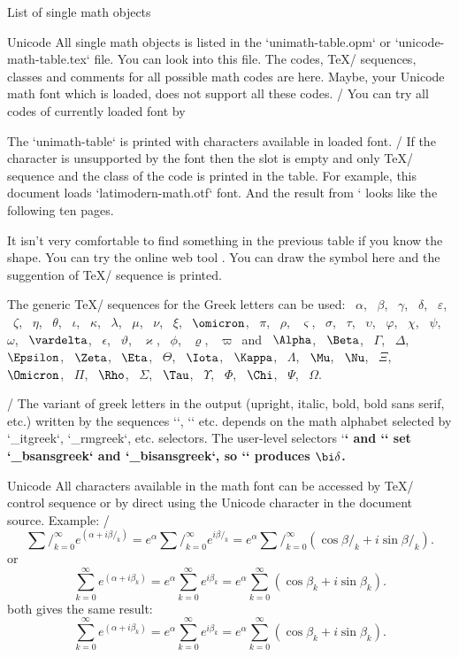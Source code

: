 \secc[objects] List of single math objects

\new Unicode
All single math objects is listed in the `unimath-table.opm` or
`unicode-math-table.tex` file. You can
look into this file. The codes, \TeX/ sequences, classes and comments
for all possible math codes are here. Maybe, your Unicode math font which is loaded,
does not support all these codes. 
\new \OpTeX/
You can try all codes of currently loaded font by
\begtt

\endtt
The `unimath-table` is printed with characters available in loaded font.
\new \OpTeX/
If the character is unsupported by the font then the slot is empty and only
\TeX/ sequence and the class of the code is printed in the table.
For example, this document loads `latimodern-math.otf` font.
And the result from ` looks like the following ten
pages.

\bigskip

\bigskip

It isn't very comfortable to find something in the previous table
if you know the shape. You can try the online web tool
.
You can draw the symbol here and the suggention of \TeX/ sequence is
printed.

\def\g#1{{\tt\string#1}~$#1$}

The generic \TeX/ sequences for the Greek letters can be used:
\g\alpha, \g\beta, \g\gamma, \g\delta, \g\varepsilon, \g\zeta, \g\eta,
\g\theta, \g\iota, \g\kappa, \g\lambda, \g\mu, \g\nu, \g\xi,
\g\omicron, \g\pi, \g\rho, \g\varsigma, \g\sigma, \g\tau, \g\upsilon,
\g\varphi, \g\chi, \g\psi, \g\omega, \g\vardelta, \g\epsilon, \g\vartheta,
\g\varkappa, \g\phi, \g\varrho, \g\varpi\
and
\g\Alpha, \g\Beta, \g\Gamma, \g\Delta, \g\Epsilon, \g\Zeta, \g\Eta, \g\Theta,
\g\Iota, \g\Kappa, \g\Lambda, \g\Mu, \g\Nu, \g\Xi, \g\Omicron, \g\Pi, \g\Rho,
\g\Sigma, \g\Tau, \g\Upsilon, \g\Phi, \g\Chi, \g\Psi, \g\Omega.

\new \OpTeX/
The variant of greek letters in the output
(upright, italic, bold, bold sans serif, etc.)
written by the sequences `\alpha`, `\beta` etc. depends on the math alphabet
selected by `\_itgreek`, `\_rmgreek`, etc. selectors. The user-level
selectors `\bf` and `\bi` set `\_bsansgreek` and `\_bisansgreek`, so
`{\bi\delta}` produces $\bi\delta$.

\new Unicode
All characters available in the math font can be accessed by \TeX/ control
sequence or by direct using the Unicode character in the document source.
Example:
\begtt \adef/{}
$$ 
   \sum/_{k=0}^\infty e^{(\alpha+i\beta/_k)} = 
   e^\alpha \sum/_{k=0}^\infty e^{i\beta/_k} = 
   e^\alpha \sum/_{k=0}^\infty (\cos\beta/_k + i\sin\beta/_k). 
$$
\endtt
or
\begtt \ttspec
$$
   ∑_{k=0}^∞ e^{(α + iβ_k)} = e^α ∑_{k=0}^∞ e^{iβ_k} 
                            = e^α ∑_{k=0}^∞ (\cos β_k + i\sin β_k). 
$$
\endtt
both gives the same result:
$$
  ∑_{k=0}^∞ e^{(α + iβ_k)} = e^α ∑_{k=0}^∞ e^{iβ_k} 
                           = e^α ∑_{k=0}^∞ (\cos β_k + i\sin β_k).
$$
\medskip


